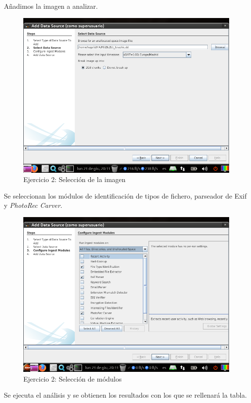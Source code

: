 \documentclass[11pt]{article}
\begin{document}
Añadimos la imagen a analizar.

\begin{figure}[H]
  \caption{Ejercicio 2: Selección de la imagen}
  \centering
  \includegraphics[scale=0.7]{e2-3.png}
\end{figure}

Se seleccionan los módulos de identificación de tipos de fichero, parseador de Exif y \textit{PhotoRec Carver}.

\begin{figure}[H]
  \caption{Ejercicio 2: Selección de módulos}
  \centering
  \includegraphics[scale=0.7]{e2-4.png}
\end{figure}

Se ejecuta el análisis y se obtienen los resultados con los que se rellenará la tabla.
\end{document}
